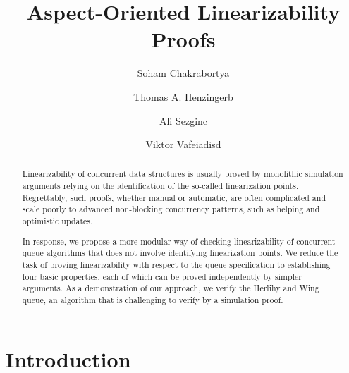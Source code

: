 \documentclass{LMCS}
\begin{document}
\title[Aspect-Oriented Linearizability Proofs]{Aspect-Oriented Linearizability Proofs\rsuper*}

\author[S.~Chakraborty]{Soham Chakraborty\rsuper a}
\address{{}MPI-SWS, Kaiserslautern and Saarbr\"ucken, Germany}

\author[T.~A.~Henzinger]{Thomas A. Henzinger\rsuper b}
\address{{\lsuper b}IST Austria, Klosterneuburg, Austria}

\author[A.~Sezgin]{Ali Sezgin\rsuper c}
\address{{\lsuper c}University of Cambridge Computer Laboratory, Cambridge, U.K.}

\author[V.~Vafeiadis]{Viktor Vafeiadis\rsuper d}
\address{\vspace{-18 pt}}



\begin{abstract}
Linearizability of concurrent data structures is usually proved by monolithic
simulation arguments relying on the identification of the so-called linearization points.
Regrettably, such proofs, whether manual or automatic, are often complicated
and scale poorly to advanced non-blocking concurrency patterns, such as helping
and optimistic updates.

In response, we propose a more modular way of checking linearizability of
concurrent queue algorithms that does not involve identifying linearization
points.  We reduce the task of proving linearizability
with respect to the queue specification to establishing four basic
properties, each of which can be proved independently by simpler
arguments.  As a demonstration of our approach, we verify the Herlihy and Wing
queue, an algorithm that is challenging to verify by a simulation
proof.  

\end{abstract}

\maketitle



\section{Introduction}
\label{sec:introduction}
\end{document}
